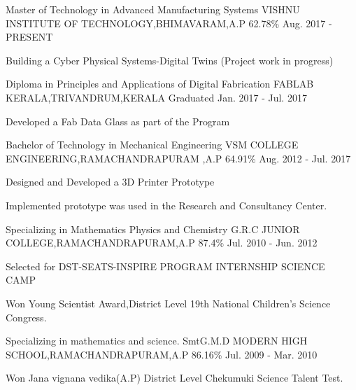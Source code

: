 \begin{cventries}
  \cventry
    {Master of Technology in Advanced Manufacturing Systems}
    {VISHNU INSTITUTE OF TECHNOLOGY,BHIMAVARAM,A.P}
    {62.78\%}
    {Aug. 2017 - PRESENT}
    {
      \begin{cvitems}
        \item {Building a Cyber Physical Systems-Digital Twins (Project work in progress)}  
      \end{cvitems}
    }
  \cventry
    {Diploma in Principles and Applications of Digital Fabrication}
    {FABLAB KERALA,TRIVANDRUM,KERALA}
    {Graduated}
    {Jan. 2017 - Jul. 2017}
    {
      \begin{cvitems}
        \item {Developed a Fab Data Glass as part of the Program }
      \end{cvitems}
    }
  \cventry
    {Bachelor of Technology in Mechanical Engineering}
    {VSM COLLEGE ENGINEERING,RAMACHANDRAPURAM ,A.P}
    {64.91\%}
    {Aug. 2012 - Jul. 2017}
    {
      \begin{cvitems}
        \item {Designed and Developed a 3D Printer Prototype }
        \item {Implemented prototype was used in the Research and Consultancy Center.}
      \end{cvitems} 
    }
  \cventry
    {Specializing in Mathematics Physics and Chemistry}
    {G.R.C JUNIOR COLLEGE,RAMACHANDRAPURAM,A.P}
    {87.4\%}
    {Jul. 2010 - Jun. 2012}
    {
      \begin{cvitems}
	\item{Selected for DST-SEATS-INSPIRE PROGRAM INTERNSHIP SCIENCE CAMP}
        \item {Won Young Scientist Award,District Level 19th National Children's Science Congress.}
      \end{cvitems}
    }
  \cventry
    {Specializing in mathematics and science.}
    {SmtG.M.D MODERN HIGH SCHOOL,RAMACHANDRAPURAM,A.P}
    {86.16\%}
    {Jul. 2009 - Mar. 2010}
    {
      \begin{cvitems}
        \item {Won Jana vignana vedika(A.P) District Level Chekumuki Science Talent Test.}
      \end{cvitems}
}
\end{cventries}
